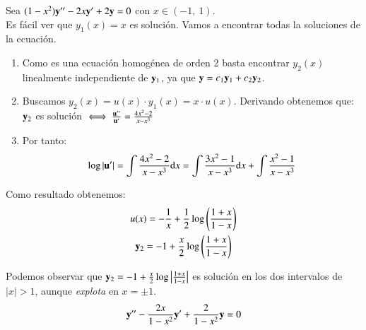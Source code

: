 \begin{eg}
    Sea $(1-x^2)\mathbf{y}'' - 2x\mathbf{y}' + 2\mathbf{y} = 0$ con $x\in(-1,\ 1)$.\\%
    Es fácil ver que $y_1(x) = x$ es solución. Vamos a encontrar todas la soluciones de la ecuación.
    \begin{enumerate}
        \item Como es una ecuación homogénea de orden 2 basta encontrar $y_2(x)$ linealmente independiente de $\mathbf{y}_1$, ya que $\mathbf{y} = c_1 \mathbf{y}_1 + c_2 \mathbf{y}_2$.
        \item Buscamos $y_2(x) = u(x)\cdot y_1(x) = x \cdot u(x)$. Derivando obtenemos que:\\
        $\mathbf{y}_2$ es solución $\iff \frac{\mathbf{u}''}{\mathbf{u}'} = \frac{4x^2-2}{x-x^3}$
        \item Por tanto:$$
            \log |\mathbf{u}'| = \int \frac{4x^2-2}{x-x^3} \mathrm{d} x = \int \frac{3x^2-1}{x-x^3} \mathrm{d} x + \int \frac{x^2-1}{x-x^3}
            $$
    \end{enumerate}
    Como resultado obtenemos:
    \begin{gather*}
        u(x) = -\frac{1}{x} + \frac{1}{2}\log\left(\frac{1+x}{1-x}\right)\\
        \mathbf{y}_2 = -1 + \frac{x}{2}\log\left(\frac{1+x}{1-x}\right)
    \end{gather*}

    Podemos observar que $\mathbf{y}_2 = -1 + \frac{x}{2}\log\left|\frac{1+x}{1-x}\right|$ es solución en los dos intervalos de $|x| > 1$, aunque \textit{explota} en $x = \pm 1$.
    $$
        \mathbf{y}'' - \frac{2x}{1-x^2}\mathbf{y}' + \frac{2}{1-x^2}\mathbf{y} = 0
    $$
\end{eg}
